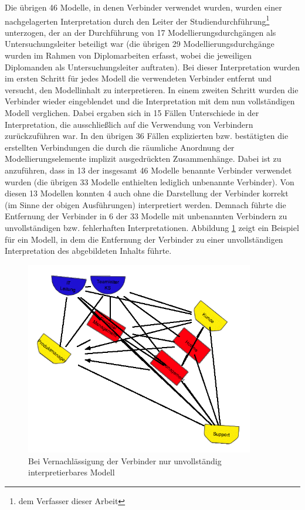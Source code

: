 Die übrigen 46 Modelle, in denen Verbinder verwendet wurden, wurden einer nachgelagerten Interpretation durch den Leiter der Studiendurchführung\footnote{dem Verfasser dieser Arbeit} unterzogen, der an der Durchführung von 17 Modellierungsdurchgängen als Untersuchungsleiter beteiligt war (die übrigen 29 Modellierungsdurchgänge wurden im Rahmen von Diplomarbeiten erfasst, wobei die jeweiligen Diplomanden als Untersuchungsleiter auftraten). Bei dieser Interpretation wurden im ersten Schritt für jedes Modell die verwendeten Verbinder entfernt und versucht, den Modellinhalt zu interpretieren. In einem zweiten Schritt wurden die Verbinder wieder eingeblendet und die Interpretation mit dem nun vollständigen Modell verglichen. Dabei ergaben sich in 15 Fällen Unterschiede in der Interpretation, die ausschließlich auf die Verwendung von Verbindern zurückzuführen war. In den übrigen 36 Fällen explizierten bzw. bestätigten die erstellten Verbindungen die durch die räumliche Anordnung der Modellierungselemente implizit ausgedrückten Zusammenhänge. Dabei ist zu anzuführen, dass in 13 der insgesamt 46 Modelle benannte Verbinder verwendet wurden (die übrigen 33 Modelle enthielten lediglich unbenannte Verbinder). Von diesen 13 Modellen konnten 4 auch ohne die Darstellung der Verbinder korrekt (im Sinne der obigen Ausführungen) interpretiert werden. Demnach führte die Entfernung der Verbinder in 6 der 33 Modelle mit unbenannten Verbindern zu unvollständigen bzw. fehlerhaften Interpretationen. Abbildung \ref{fig:img_Evaluierung_modell_verbinder_wichtig} zeigt ein Beispiel für ein Modell, in dem die Entfernung der Verbinder zu einer unvollständigen Interpretation des abgebildeten Inhalts führte.

\begin{figure}[htbp]
	\centering
		\includegraphics[width=10cm]{img/Evaluierung/modell_verbinder_wichtig.png}
	\caption{Bei Vernachlässigung der Verbinder nur unvollständig interpretierbares Modell}
	\label{fig:img_Evaluierung_modell_verbinder_wichtig}
\end{figure}


